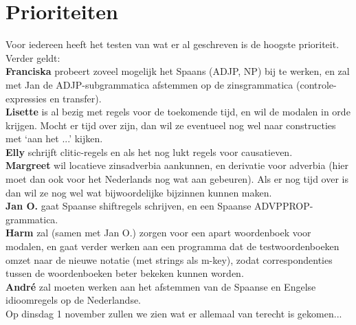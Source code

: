 \section{Prioriteiten}
Voor iedereen heeft het testen van wat er al geschreven is de hoogste 
prioriteit. Verder geldt: \\
{\bf Franciska} probeert zoveel mogelijk het Spaans (ADJP, NP) bij te werken, 
en zal met Jan de ADJP-subgrammatica afstemmen op de zinsgrammatica (controle-
expressies en transfer).\\
{\bf Lisette} is al bezig met regels voor de toekomende tijd, en wil de modalen 
in orde krijgen. Mocht er tijd over zijn, dan wil ze eventueel nog wel naar 
constructies met `aan het ...' kijken.\\
{\bf Elly} schrijft clitic-regels en als het nog lukt regels voor causatieven.
\\
{\bf Margreet} wil locatieve zinsadverbia aankunnen, en derivatie voor adverbia
(hier moet dan ook voor het Nederlands nog wat aan gebeuren). Als er nog tijd 
over is dan wil ze nog wel wat bijwoordelijke bijzinnen kunnen maken.\\
{\bf Jan O.} gaat Spaanse shiftregels schrijven, en een Spaanse ADVPPROP-
grammatica.\\
{\bf Harm} zal (samen met Jan O.) zorgen voor een apart woordenboek voor 
modalen, en gaat verder werken aan een programma dat de testwoordenboeken omzet 
naar de nieuwe notatie (met strings als m-key), zodat correspondenties tussen 
de woordenboeken beter bekeken kunnen worden.\\
{\bf Andr\'{e}} zal moeten werken aan het afstemmen van de Spaanse en Engelse 
idioomregels op de Nederlandse.\\

\noindent
Op dinsdag 1 november zullen we zien wat er allemaal van terecht is gekomen...


